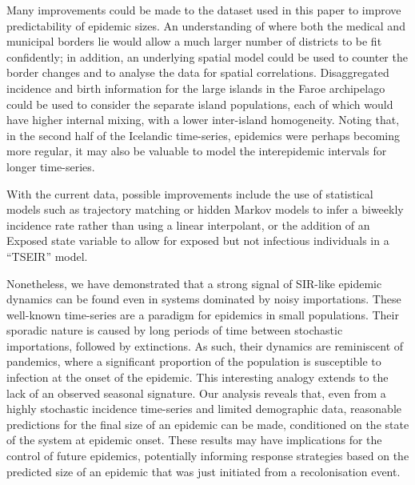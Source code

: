 \documentclass[10pt]{article}
\begin{document}
Many improvements could be made to the dataset used in this paper to improve predictability of epidemic sizes. An understanding of where both the medical and municipal borders lie would allow a much larger number of districts to be fit confidently; in addition, an underlying spatial model could be used to counter the border changes and to analyse the data for spatial correlations. Disaggregated incidence and birth information for the large islands in the Faroe archipelago could be used to consider the separate island populations, each of which would have higher internal mixing, with a lower inter-island homogeneity. Noting that, in the second half of the Icelandic time-series, epidemics were perhaps becoming more regular, it may also be valuable to model the interepidemic intervals for longer time-series. 

With the current data, possible improvements include the use of statistical models such as trajectory matching or hidden Markov models to infer a biweekly incidence rate rather than using a linear interpolant, or the addition of an Exposed state variable to allow for exposed but not infectious individuals in a ``TSEIR'' model. 

Nonetheless, we have demonstrated that a strong signal of SIR-like epidemic dynamics can be found even in systems dominated by noisy importations. These well-known time-series \cite{Cliff1981, Cliff2000} are a paradigm for epidemics in small populations. Their sporadic nature is caused by long periods of time between stochastic importations, followed by extinctions. As such, their dynamics are reminiscent of pandemics, where a significant proportion of the population is susceptible to infection at the onset of the epidemic. This interesting analogy extends to the lack of an observed seasonal signature. Our analysis reveals that, even from a highly stochastic incidence time-series and limited demographic data, reasonable predictions for the final size of an epidemic can be made, conditioned on the state of the system at epidemic onset. These results may have implications for the control of future epidemics, potentially informing response strategies based on the predicted size of an epidemic that was just initiated from a recolonisation event.
\end{document}
